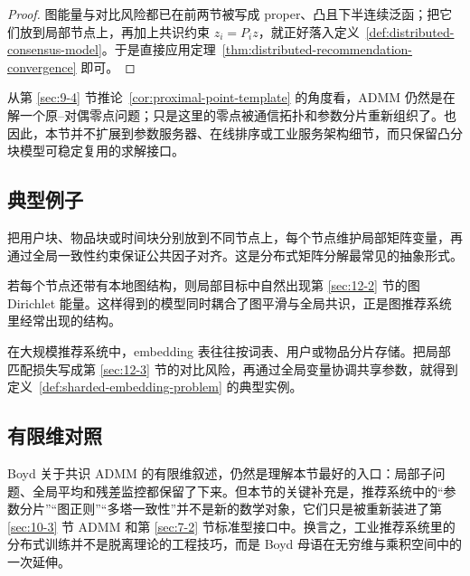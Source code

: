 \begin{proof}
图能量与对比风险都已在前两节被写成 proper、凸且下半连续泛函；把它们放到局部节点上，再加上共识约束 $z_i=P_i z$，就正好落入定义~\ref{def:distributed-consensus-model}。于是直接应用定理~\ref{thm:distributed-recommendation-convergence} 即可。
\end{proof}

\begin{remark}
从第 \ref{sec:9-4} 节推论~\ref{cor:proximal-point-template} 的角度看，ADMM 仍然是在解一个原--对偶零点问题；只是这里的零点被通信拓扑和参数分片重新组织了。也因此，本节并不扩展到参数服务器、在线排序或工业服务架构细节，而只保留凸分块模型可稳定复用的求解接口。
\end{remark}

\subsection{典型例子}

\begin{example}[共识矩阵分解]
把用户块、物品块或时间块分别放到不同节点上，每个节点维护局部矩阵变量，再通过全局一致性约束保证公共因子对齐。这是分布式矩阵分解最常见的抽象形式。
\end{example}

\begin{example}[图正则推荐]
若每个节点还带有本地图结构，则局部目标中自然出现第 \ref{sec:12-2} 节的图 Dirichlet 能量。这样得到的模型同时耦合了图平滑与全局共识，正是图推荐系统里经常出现的结构。
\end{example}

\begin{example}[分片 embedding 训练]
在大规模推荐系统中，embedding 表往往按词表、用户或物品分片存储。把局部匹配损失写成第 \ref{sec:12-3} 节的对比风险，再通过全局变量协调共享参数，就得到定义~\ref{def:sharded-embedding-problem} 的典型实例。
\end{example}

\subsection*{有限维对照}

Boyd 关于共识 ADMM 的有限维叙述，仍然是理解本节最好的入口：局部子问题、全局平均和残差监控都保留了下来。但本节的关键补充是，推荐系统中的“参数分片”“图正则”“多塔一致性”并不是新的数学对象，它们只是被重新装进了第 \ref{sec:10-3} 节 ADMM 和第 \ref{sec:7-2} 节标准型接口中。换言之，工业推荐系统里的分布式训练并不是脱离理论的工程技巧，而是 Boyd 母语在无穷维与乘积空间中的一次延伸。

